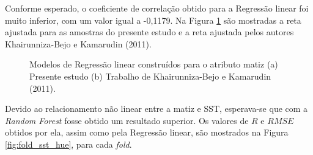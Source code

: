 Conforme esperado, o coeficiente de correlação obtido para a Regressão linear foi muito inferior, com um valor igual a -0,1179. Na Figura \ref{fig:comp_hue} são mostradas a reta ajustada para as amostras do presente estudo e a reta ajustada pelos autores Khairunniza-Bejo e Kamarudin (2011).

\begin{figure}[H]
\centering
    \caption{\label{fig:comp_hue} Modelos de Regressão linear construídos para o atributo matiz (a) Presente estudo (b) Trabalho de Khairunniza-Bejo e Kamarudin (2011).}
\end{figure}

Devido ao relacionamento não linear entre a matiz e SST, esperava-se que com a \textit{Random Forest} fosse obtido um resultado superior. Os valores de $R$ e $RMSE$ obtidos por ela, assim como pela Regressão linear, são mostrados na Figura \ref{fig:fold_sst_hue}, para cada \textit{fold}.


